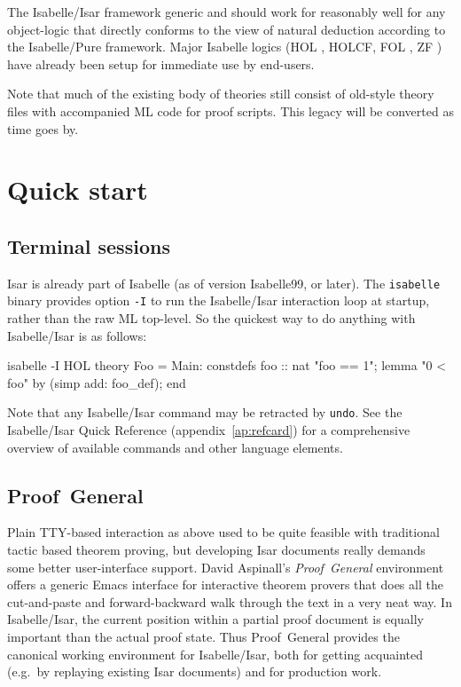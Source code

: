 \medskip The Isabelle/Isar framework generic and should work for reasonably
well for any object-logic that directly conforms to the view of natural
deduction according to the Isabelle/Pure framework.  Major Isabelle logics
(HOL \cite{isabelle-HOL}, HOLCF, FOL \cite{isabelle-logics}, ZF
\cite{isabelle-ZF}) have already been setup for immediate use by end-users.

Note that much of the existing body of theories still consist of old-style
theory files with accompanied ML code for proof scripts.  This legacy will be
converted as time goes by.


\section{Quick start}

\subsection{Terminal sessions}

Isar is already part of Isabelle (as of version Isabelle99, or later).  The
\texttt{isabelle} binary provides option \texttt{-I} to run the Isabelle/Isar
interaction loop at startup, rather than the raw ML top-level.  So the
quickest way to do anything with Isabelle/Isar is as follows:
\begin{ttbox}
isabelle -I HOL\medskip
{}\medskip
theory Foo = Main:
constdefs foo :: nat  "foo == 1";
lemma "0 < foo" by (simp add: foo_def);
end
\end{ttbox}
Note that any Isabelle/Isar command may be retracted by \texttt{undo}.  See
the Isabelle/Isar Quick Reference (appendix~\ref{ap:refcard}) for a
comprehensive overview of available commands and other language elements.


\subsection{Proof~General}

Plain TTY-based interaction as above used to be quite feasible with
traditional tactic based theorem proving, but developing Isar documents really
demands some better user-interface support.  David Aspinall's
\emph{Proof~General} environment
\cite{proofgeneral,Aspinall:TACAS:2000} offers a generic Emacs interface for
interactive theorem provers that does all the cut-and-paste and
forward-backward walk through the text in a very neat way.  In Isabelle/Isar,
the current position within a partial proof document is equally important than
the actual proof state.  Thus Proof~General provides the canonical working
environment for Isabelle/Isar, both for getting acquainted (e.g.\ by replaying
existing Isar documents) and for production work.



